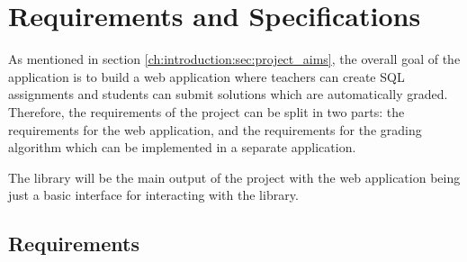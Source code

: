 \chapter{Requirements and Specifications} \label{ch:reqandspec}

As mentioned in section \ref{ch:introduction:sec:project_aims}, the overall goal of the application is to build a web application where teachers can create SQL assignments and students can submit solutions which are automatically graded. Therefore, the requirements of the project can be split in two parts: the requirements for the web application, and the requirements for the grading algorithm which can be implemented in a separate application. 

The library will be the main output of the project with the web application being just a basic interface for interacting with the library.

\section{Requirements} \label{ch:reqandspec:sec:rec}

